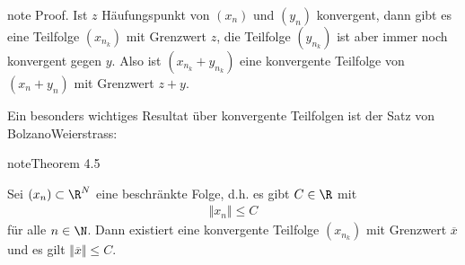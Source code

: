 \documentclass[letterpaper,10pt,english]{jupyterBook}
\begin{document}
\begin{sphinxadmonition}{note}
Proof.  Ist \(z\) Häufungspunkt von \((x_n)\) und \((y_n)\) konvergent, dann gibt es eine Teilfolge \((x_{n_k})\) mit Grenzwert \(z\), die Teilfolge \((y_{n_k})\) ist aber immer noch konvergent gegen \(y\). Also ist \((x_{n_k}+y_{n_k})\) eine konvergente Teilfolge von \((x_n+y_n)\) mit Grenzwert \(z+y\).
\end{sphinxadmonition}

Ein besonders wichtiges Resultat über konvergente Teilfolgen ist der Satz von Bolzano\sphinxhyphen{}Weierstrass:
\label{metrik/teilfolgen:theorem-5}
\begin{sphinxadmonition}{note}{Theorem 4.5}



Sei \((x_n) \subset \R^N\) eine beschränkte Folge, d.h. es gibt \(C \in \R\) mit
\begin{equation*}
\begin{split} \Vert x_n \Vert \leq C\end{split}
\end{equation*}
für alle \(n \in \N\). Dann existiert eine konvergente Teilfolge \((x_{n_k})\) mit Grenzwert \(\overline{x}\) und es gilt \(\Vert \overline{x} \Vert \leq C\).
\end{sphinxadmonition}
\end{document}
